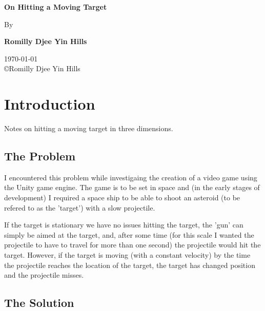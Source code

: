 \documentclass[12pt,a4paper]{report}
\begin{document}
\begin{titlepage}
	\begin{center}
		\large
		\vspace*{1cm}
        		
 		\textbf{On Hitting a Moving Target}
        
		\vspace{0.5cm}
		By
        
		\vspace{1.5cm}
        
		\textbf{Romilly Djee Yin Hills}\\

		\vspace{1.5cm}

		\today \\
		\copyright Romilly Djee Yin Hills\\
        
	\end{center}
\end{titlepage}


\chapter{Introduction}
\label{Introduction}

Notes on hitting a moving target in three dimensions.

\section{The Problem}
\label{section_the_problem}

I encountered this problem while investigaing the creation of a video game using the Unity game engine\cite{unity_webpage}. The game is to be set in space and (in the early stages of development) I required a space ship to be able to shoot an asteroid (to be refered to as the 'target') with a slow projectile.

If the target is stationary we have no issues hitting the target, the 'gun' can simply be aimed at the target, and, after some time (for this scale I wanted the projectile to have to travel for more than one second) the projectile would hit the target. However, if the target is moving (with a constant velocity) by the time the projectile reaches the location of the target, the target has changed position and the projectile misses.


\section{The Solution}
\label{section_the_solution}
\end{document}
